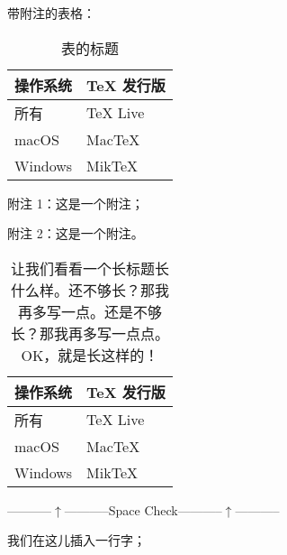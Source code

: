 带附注的表格：

\begin{table}[!h]
  \centering
  \begin{threeparttable}
    \caption{表的标题}
    \label{tab:exampletablewithnote}
    \begin{tabular}{p{4cm}p{4cm}}
      \toprule
      \multicolumn{1}{c}{\textbf{操作系统}} & \multicolumn{1}{c}{\textbf{TeX 发行版}} \\
      \midrule
      所有                                  & TeX Live                                \\
      macOS                                 & MacTeX                                  \\
      Windows                               & MikTeX                                  \\
      \bottomrule
    \end{tabular}
    \begin{tablenotes}
      \item 附注 1：这是一个附注；
      \item 附注 2：这是一个附注。
    \end{tablenotes}
  \end{threeparttable}
\end{table}


\begin{table}[!h]
  \centering
  \caption{让我们看看一个长标题长什么样。还不够长？那我再多写一点。还是不够长？那我再多写一点点。OK，就是长这样的！}
  \label{tab:exampletablelongcap}
  \begin{tabular}{p{4cm}p{4cm}}
    \toprule
    \multicolumn{1}{c}{\textbf{操作系统}} & \multicolumn{1}{c}{\textbf{TeX 发行版}} \\
    \midrule
    所有                                  & TeX Live                                \\
    macOS                                 & MacTeX                                  \\
    Windows                               & MikTeX                                  \\
    \bottomrule
  \end{tabular}
\end{table}

\centerline{-----------$\uparrow$-----------Space Check-----------$\uparrow$-----------}

我们在这儿插入一行字；

